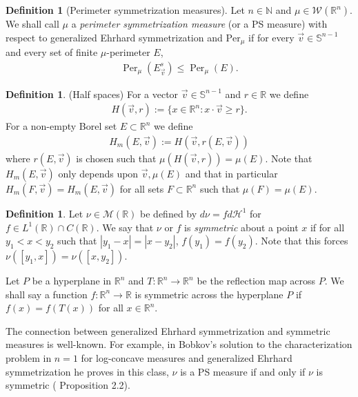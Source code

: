 \documentclass[12pt]{amsart}
\numberwithin{equation}{section}
\theoremstyle{plain}
\theoremstyle{definition}
\newtheorem{definition}[theorem]{Definition}
\begin{document}
\begin{definition}[Perimeter symmetrization measures]
Let $n \in \mathbb{N}$ and $\mu \in \mathscr{W}(\mathbb{R}^n)$.  We shall call $\mu$ a \textit{perimeter symmetrization measure} (or a PS measure) with respect to generalized Ehrhard symmetrization and $\text{Per}_{\mu}$ if for every $\vec{v} \in \mathbb{S}^{n-1}$ and every set of finite $\mu$-perimeter $E$,
\begin{align}
    \operatorname{Per}_{\mu}(E^s_{\vec{v}}) \le \operatorname{Per}_{\mu}(E).
\end{align}
\end{definition}

\begin{definition}(Half spaces)
    For a vector $\vec{v} \in \mathbb{S}^{n-1}$ and $r \in \mathbb{R}$ we define
    \begin{align*}
        H(\vec{v}, r) := \{x \in \mathbb{R}^n: x \cdot \vec{v} \ge r\}.
    \end{align*}
For a non-empty Borel set $E \subset \mathbb{R}^n$ we define 
    \begin{align}\label{e:half space of equal measure}
        H_m(E, \vec{v}):= H(\vec{v}, r(E, \vec{v})) 
    \end{align}
where $r(E, \vec{v})$ is chosen such that $\mu(H(\vec{v}, r)) = \mu(E)$.  Note that $H_{m}(E, \vec{v})$ only depends upon $\vec{v}, \mu(E)$ and that in particular $H_m(F, \vec{v}) = H_m(E, \vec{v})$ for all sets $F \subset \mathbb{R}^n$ such that $\mu(F) = \mu(E).$ 
\end{definition}

\begin{definition}\label{d: symmetric in measure}
Let $\nu \in \mathcal{M}(\mathbb{R})$ be defined by $d\nu = f d\mathcal{H}^1$ for $f\in L^1(\mathbb{R}) \cap C(\mathbb{R})$. We say that $\nu$ or $f$ is \textit{symmetric} about a point $x$ if for all $y_1<x<y_2$ such that $|y_1-x| = |x-y_2|$, $f(y_1) = f(y_2)$. Note that this forces $\nu([y_1, x]) = \nu([x, y_2])$. 

Let $P$ be a hyperplane in $\mathbb{R}^n$ and $T:\mathbb{R}^n \rightarrow \mathbb{R}^n$ be the reflection map across $P$. We shall say a function $f:\mathbb{R}^n \rightarrow \mathbb{R}$ is symmetric across the hyperplane $P$ if $f(x) = f(T(x))$ for all $x \in \mathbb{R}^{n}$.
\end{definition}

The connection between generalized Ehrhard symmetrization and symmetric measures is well-known.  For example, in Bobkov's solution to the characterization problem in $n=1$ for log-concave measures and generalized Ehrhard symmetrization he proves in this class, $\nu$ is a PS measure if and only if $\nu$ is symmetric   (\cite{Bobkov96} Proposition 2.2).  
\end{document}
